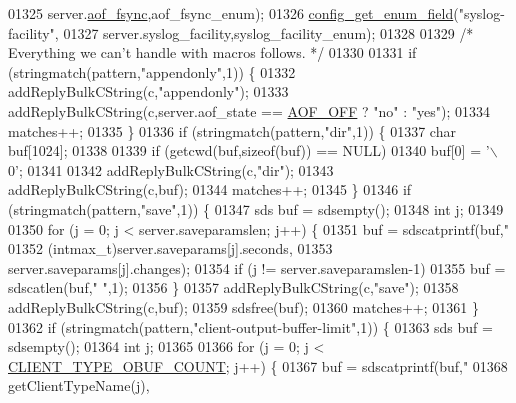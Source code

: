 \begin{DoxyCode}
{{{{{{{{{{01325             server.\hyperlink{config_8h_af5994c643c434574580bb7816af82cad}{aof\_fsync},aof\_fsync\_enum);
01326     \hyperlink{config_8c_a70dc0615718e584a2c51615aba594479}{config\_get\_enum\_field}(\textcolor{stringliteral}{"syslog-facility"},
01327             server.syslog\_facility,syslog\_facility\_enum);
01328 
01329     \textcolor{comment}{/* Everything we can't handle with macros follows. */}
01330 
01331     \textcolor{keywordflow}{if} (stringmatch(pattern,\textcolor{stringliteral}{"appendonly"},1)) \{
01332         addReplyBulkCString(c,\textcolor{stringliteral}{"appendonly"});
01333         addReplyBulkCString(c,server.aof\_state == \hyperlink{server_8h_a5226306fbcebcb6d5d02e0fef3c213c2}{AOF\_OFF} ? \textcolor{stringliteral}{"no"} : \textcolor{stringliteral}{"yes"});
01334         matches++;
01335     \}
01336     \textcolor{keywordflow}{if} (stringmatch(pattern,\textcolor{stringliteral}{"dir"},1)) \{
01337         \textcolor{keywordtype}{char} buf[1024];
01338 
01339         \textcolor{keywordflow}{if} (getcwd(buf,\textcolor{keyword}{sizeof}(buf)) == NULL)
01340             buf[0] = \textcolor{stringliteral}{'\(\backslash\)0'};
01341 
01342         addReplyBulkCString(c,\textcolor{stringliteral}{"dir"});
01343         addReplyBulkCString(c,buf);
01344         matches++;
01345     \}
01346     \textcolor{keywordflow}{if} (stringmatch(pattern,\textcolor{stringliteral}{"save"},1)) \{
01347         sds buf = sdsempty();
01348         \textcolor{keywordtype}{int} j;
01349 
01350         \textcolor{keywordflow}{for} (j = 0; j < server.saveparamslen; j++) \{
01351             buf = sdscatprintf(buf,\textcolor{stringliteral}{"%
01352                     (intmax\_t)server.saveparams[j].seconds,
01353                     server.saveparams[j].changes);
01354             \textcolor{keywordflow}{if} (j != server.saveparamslen-1)
01355                 buf = sdscatlen(buf,\textcolor{stringliteral}{" "},1);
01356         \}
01357         addReplyBulkCString(c,\textcolor{stringliteral}{"save"});
01358         addReplyBulkCString(c,buf);
01359         sdsfree(buf);
01360         matches++;
01361     \}
01362     \textcolor{keywordflow}{if} (stringmatch(pattern,\textcolor{stringliteral}{"client-output-buffer-limit"},1)) \{
01363         sds buf = sdsempty();
01364         \textcolor{keywordtype}{int} j;
01365 
01366         \textcolor{keywordflow}{for} (j = 0; j < \hyperlink{server_8h_aea8f6f3fac3a68e35807eba109dbc501}{CLIENT\_TYPE\_OBUF\_COUNT}; j++) \{
01367             buf = sdscatprintf(buf,\textcolor{stringliteral}{"%
01368                     getClientTypeName(j),
}}}}}}}}}}}}
\end{DoxyCode}
